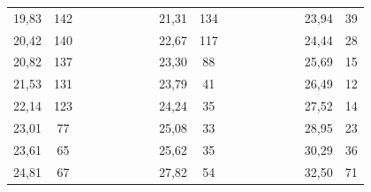 \begin{enumerate}
\begin{table}[h!]
{\begin{tabular}{|cc|cccccccccccccccc}
					\multicolumn{1}{|c|}{19,83}    & 142               &  &  &  &  &  & \multicolumn{1}{c|}{} & \multicolumn{1}{c|}{21,31}    & \multicolumn{1}{c|}{134}               &  &  &  &  &  & \multicolumn{1}{c|}{} & \multicolumn{1}{c|}{23,94}    & \multicolumn{1}{c|}{39}                \\ \cline{1-2} \cline{9-10} \cline{17-18} 
					\multicolumn{1}{|c|}{20,42}    & 140               &  &  &  &  &  & \multicolumn{1}{c|}{} & \multicolumn{1}{c|}{22,67}    & \multicolumn{1}{c|}{117}               &  &  &  &  &  & \multicolumn{1}{c|}{} & \multicolumn{1}{c|}{24,44}    & \multicolumn{1}{c|}{28}                \\ \cline{1-2} \cline{9-10} \cline{17-18} 
					\multicolumn{1}{|c|}{20,82}    & 137               &  &  &  &  &  & \multicolumn{1}{c|}{} & \multicolumn{1}{c|}{23,30}    & \multicolumn{1}{c|}{88}                &  &  &  &  &  & \multicolumn{1}{c|}{} & \multicolumn{1}{c|}{25,69}    & \multicolumn{1}{c|}{15}                \\ \cline{1-2} \cline{9-10} \cline{17-18} 
					\multicolumn{1}{|c|}{21,53}    & 131               &  &  &  &  &  & \multicolumn{1}{c|}{} & \multicolumn{1}{c|}{23,79}    & \multicolumn{1}{c|}{41}                &  &  &  &  &  & \multicolumn{1}{c|}{} & \multicolumn{1}{c|}{26,49}    & \multicolumn{1}{c|}{12}                \\ \cline{1-2} \cline{9-10} \cline{17-18} 
					\multicolumn{1}{|c|}{22,14}    & 123               &  &  &  &  &  & \multicolumn{1}{c|}{} & \multicolumn{1}{c|}{24,24}    & \multicolumn{1}{c|}{35}                &  &  &  &  &  & \multicolumn{1}{c|}{} & \multicolumn{1}{c|}{27,52}    & \multicolumn{1}{c|}{14}                \\ \cline{1-2} \cline{9-10} \cline{17-18} 
					\multicolumn{1}{|c|}{23,01}    & 77                &  &  &  &  &  & \multicolumn{1}{c|}{} & \multicolumn{1}{c|}{25,08}    & \multicolumn{1}{c|}{33}                &  &  &  &  &  & \multicolumn{1}{c|}{} & \multicolumn{1}{c|}{28,95}    & \multicolumn{1}{c|}{23}                \\ \cline{1-2} \cline{9-10} \cline{17-18} 
					\multicolumn{1}{|c|}{23,61}    & 65                &  &  &  &  &  & \multicolumn{1}{c|}{} & \multicolumn{1}{c|}{25,62}    & \multicolumn{1}{c|}{35}                &  &  &  &  &  & \multicolumn{1}{c|}{} & \multicolumn{1}{c|}{30,29}    & \multicolumn{1}{c|}{36}                \\ \cline{1-2} \cline{9-10} \cline{17-18} 
					\multicolumn{1}{|c|}{24,81}    & 67                &  &  &  &  &  & \multicolumn{1}{c|}{} & \multicolumn{1}{c|}{27,82}    & \multicolumn{1}{c|}{54}                &  &  &  &  &  & \multicolumn{1}{c|}{} & \multicolumn{1}{c|}{32,50}    & \multicolumn{1}{c|}{71}                \\ \cline{1-2} \cline{9-10} \cline{17-18} 

\end{tabular}}
\end{table}
\end{enumerate}
